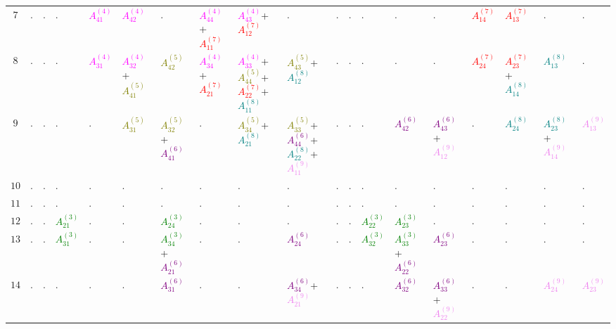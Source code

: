 \documentclass[times,namecite]{goose-article}
\begin{document}
\begin{landscape}
{\begin{tabular}{|c|C{31mm}C{31mm}C{31mm}C{31mm}C{31mm}C{31mm}C{31mm}C{31mm}C{31mm}|C{31mm}C{31mm}|C{31mm}C{31mm}C{31mm}C{31mm}C{31mm}C{31mm}C{31mm}|}
$7 $& . & . & . & \textcolor{magenta}{$A_{41}^{(4)}$} & \textcolor{magenta}{$A_{42}^{(4)}$} & . & \textcolor{magenta}{$A_{44}^{(4)}$}+\textcolor{red}{$A_{11}^{(7)}$} & \textcolor{magenta}{$A_{43}^{(4)}$}+\textcolor{red}{$A_{12}^{(7)}$} & . & . & . & . & . & . & \textcolor{red}{$A_{14}^{(7)}$} & \textcolor{red}{$A_{13}^{(7)}$} & . & . \\
$8 $& . & . & . & \textcolor{magenta}{$A_{31}^{(4)}$} & \textcolor{magenta}{$A_{32}^{(4)}$}+\textcolor{olive}{$A_{41}^{(5)}$} & \textcolor{olive}{$A_{42}^{(5)}$} & \textcolor{magenta}{$A_{34}^{(4)}$}+\textcolor{red}{$A_{21}^{(7)}$} & \textcolor{magenta}{$A_{33}^{(4)}$}+\textcolor{olive}{$A_{44}^{(5)}$}+\textcolor{red}{$A_{22}^{(7)}$}+\textcolor{teal}{$A_{11}^{(8)}$} & \textcolor{olive}{$A_{43}^{(5)}$}+\textcolor{teal}{$A_{12}^{(8)}$} & . & . & . & . & . & \textcolor{red}{$A_{24}^{(7)}$} & \textcolor{red}{$A_{23}^{(7)}$}+\textcolor{teal}{$A_{14}^{(8)}$} & \textcolor{teal}{$A_{13}^{(8)}$} & . \\
$9 $& . & . & . & . & \textcolor{olive}{$A_{31}^{(5)}$} & \textcolor{olive}{$A_{32}^{(5)}$}+\textcolor{purple}{$A_{41}^{(6)}$} & . & \textcolor{olive}{$A_{34}^{(5)}$}+\textcolor{teal}{$A_{21}^{(8)}$} & \textcolor{olive}{$A_{33}^{(5)}$}+\textcolor{purple}{$A_{44}^{(6)}$}+\textcolor{teal}{$A_{22}^{(8)}$}+\textcolor{violet}{$A_{11}^{(9)}$} & . & . & . & \textcolor{purple}{$A_{42}^{(6)}$} & \textcolor{purple}{$A_{43}^{(6)}$}+\textcolor{violet}{$A_{12}^{(9)}$} & . & \textcolor{teal}{$A_{24}^{(8)}$} & \textcolor{teal}{$A_{23}^{(8)}$}+\textcolor{violet}{$A_{14}^{(9)}$} & \textcolor{violet}{$A_{13}^{(9)}$} \\ \hline
$10 $& . & . & . & . & . & . & . & . & . & . & . & . & . & . & . & . & . & . \\
$11 $& . & . & . & . & . & . & . & . & . & . & . & . & . & . & . & . & . & . \\ \hline
$12 $& . & . & \textcolor{green}{$A_{21}^{(3)}$} & . & . & \textcolor{green}{$A_{24}^{(3)}$} & . & . & . & . & . & \textcolor{green}{$A_{22}^{(3)}$} & \textcolor{green}{$A_{23}^{(3)}$} & . & . & . & . & . \\
$13 $& . & . & \textcolor{green}{$A_{31}^{(3)}$} & . & . & \textcolor{green}{$A_{34}^{(3)}$}+\textcolor{purple}{$A_{21}^{(6)}$} & . & . & \textcolor{purple}{$A_{24}^{(6)}$} & . & . & \textcolor{green}{$A_{32}^{(3)}$} & \textcolor{green}{$A_{33}^{(3)}$}+\textcolor{purple}{$A_{22}^{(6)}$} & \textcolor{purple}{$A_{23}^{(6)}$} & . & . & . & . \\
$14 $& . & . & . & . & . & \textcolor{purple}{$A_{31}^{(6)}$} & . & . & \textcolor{purple}{$A_{34}^{(6)}$}+\textcolor{violet}{$A_{21}^{(9)}$} & . & . & . & \textcolor{purple}{$A_{32}^{(6)}$} & \textcolor{purple}{$A_{33}^{(6)}$}+\textcolor{violet}{$A_{22}^{(9)}$} & . & . & \textcolor{violet}{$A_{24}^{(9)}$} & \textcolor{violet}{$A_{23}^{(9)}$} \\

\end{tabular}}
\end{landscape}
\end{document}

